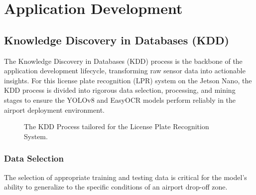 %
%
%

\usetikzlibrary{shapes, arrows, positioning, fit}

\chapter{Application Development}
\label{ch:application_development}

\section{Knowledge Discovery in Databases (KDD)}
\label{sec:kdd}

The Knowledge Discovery in Databases (KDD) process is the backbone of the application development lifecycle, transforming raw sensor data into actionable insights. For this license plate recognition (LPR) system on the Jetson Nano, the KDD process is divided into rigorous data selection, processing, and mining stages to ensure the YOLOv8 and EasyOCR models perform reliably in the airport deployment environment.

\begin{figure}[htbp]
	\centering
	
	\caption{The KDD Process tailored for the License Plate Recognition System.}
	\label{fig:kdd_process}
\end{figure}

\subsection{Data Selection}
\label{subsec:data_selection}

The selection of appropriate training and testing data is critical for the model's ability to generalize to the specific conditions of an airport drop-off zone.

